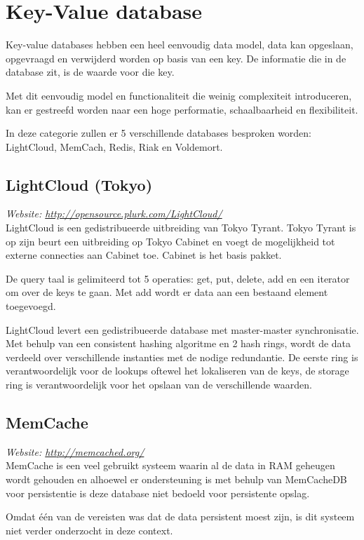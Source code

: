 \section{Key-Value database}
Key-value databases hebben een heel eenvoudig data model, data kan opgeslaan, opgevraagd en verwijderd worden op basis van een key. De informatie die in de database zit, is de waarde voor die key. 

Met dit eenvoudig model en functionaliteit die weinig complexiteit introduceren, kan er gestreefd worden naar een hoge performatie, schaalbaarheid en flexibiliteit. 

In deze categorie zullen er 5 verschillende databases besproken worden: LightCloud, MemCach, Redis, Riak en Voldemort. 

\subsection{LightCloud (Tokyo)}
\textit{Website: \url{http://opensource.plurk.com/LightCloud/}}\\
LightCloud is een gedistribueerde uitbreiding van Tokyo Tyrant. Tokyo Tyrant is op zijn beurt een uitbreiding op Tokyo Cabinet en voegt de mogelijkheid tot externe connecties aan Cabinet toe. Cabinet is het basis pakket. 

De query taal is gelimiteerd tot 5 operaties: get, put, delete, add en een iterator om over de keys te gaan. Met add wordt er data aan een bestaand element toegevoegd. 

LightCloud levert een gedistribueerde database met master-master synchronisatie. Met behulp van een consistent hashing algoritme en 2 hash rings, wordt de data verdeeld over verschillende instanties met de nodige redundantie. De eerste ring is verantwoordelijk voor de lookups oftewel het lokaliseren van de keys, de storage ring is verantwoordelijk voor het opslaan van de verschillende waarden. 

\subsection{MemCache}
\textit{Website: \url{http://memcached.org/}}\\
MemCache is een veel gebruikt systeem waarin al de data in RAM geheugen wordt gehouden en alhoewel er ondersteuning is met behulp van MemCacheDB voor persistentie is deze database niet bedoeld voor persistente opslag. 

Omdat één van de vereisten was dat de data persistent moest zijn, is dit systeem niet verder onderzocht in deze context. 

